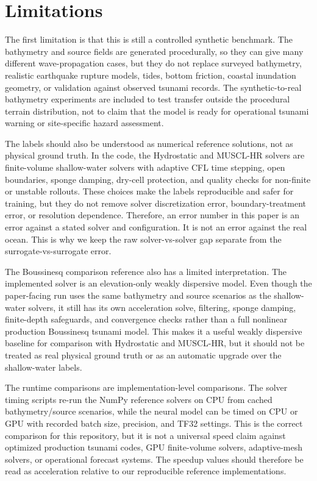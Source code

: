 \section{Limitations}
\label{sec:limitations}

The first limitation is that this is still a controlled synthetic benchmark. The bathymetry and source fields are generated procedurally, so they can give many different wave-propagation cases, but they do not replace surveyed bathymetry, realistic earthquake rupture models, tides, bottom friction, coastal inundation geometry, or validation against observed tsunami records. The synthetic-to-real bathymetry experiments are included to test transfer outside the procedural terrain distribution, not to claim that the model is ready for operational tsunami warning or site-specific hazard assessment.

The labels should also be understood as numerical reference solutions, not as physical ground truth. In the code, the Hydrostatic and MUSCL-HR solvers are finite-volume shallow-water solvers with adaptive CFL time stepping, open boundaries, sponge damping, dry-cell protection, and quality checks for non-finite or unstable rollouts. These choices make the labels reproducible and safer for training, but they do not remove solver discretization error, boundary-treatment error, or resolution dependence. Therefore, an error number in this paper is an error against a stated solver and configuration. It is not an error against the real ocean. This is why we keep the raw solver-vs-solver gap separate from the surrogate-vs-surrogate error.

The Boussinesq comparison reference also has a limited interpretation. The implemented solver is an elevation-only weakly dispersive model. Even though the paper-facing run uses the same bathymetry and source scenarios as the shallow-water solvers, it still has its own acceleration solve, filtering, sponge damping, finite-depth safeguards, and convergence checks rather than a full nonlinear production Boussinesq tsunami model. This makes it a useful weakly dispersive baseline for comparison with Hydrostatic and MUSCL-HR, but it should not be treated as real physical ground truth or as an automatic upgrade over the shallow-water labels.

The runtime comparisons are implementation-level comparisons. The solver timing scripts re-run the NumPy reference solvers on CPU from cached bathymetry/source scenarios, while the neural model can be timed on CPU or GPU with recorded batch size, precision, and TF32 settings. This is the correct comparison for this repository, but it is not a universal speed claim against optimized production tsunami codes, GPU finite-volume solvers, adaptive-mesh solvers, or operational forecast systems. The speedup values should therefore be read as acceleration relative to our reproducible reference implementations.

